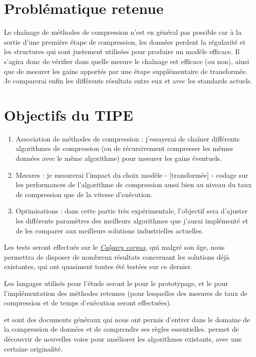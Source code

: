 \documentclass[a4paper, 11pt]{article}
\begin{document}
\section*{Problématique retenue}

Le chaînage de méthodes de compression n'est en général pas possible car à la sortie d'une première étape de compression, les données perdent la régularité et les structures qui sont justement utilisées pour produire un modèle efficace. Il s'agira donc de vérifier dans quelle mesure le chaînage est efficace (ou non), ainsi que de mesurer les gains apportés par une étape supplémentaire de transformée. Je comparerai enfin les différents résultats entre eux et avec les standards actuels.

\section*{Objectifs du TIPE}

\begin{enumerate}
  \item Association de méthodes de compression : j'essayerai de chaîner différents algorithmes de compression (ou de récursivement compresser les mêmes données avec le même algorithme) pour mesurer les gains éventuels.
  \item Mesures : je mesurerai l'impact du choix modèle - [transformée] - codage sur les performances de l'algorithme de compression aussi bien au niveau du taux de compression que de la vitesse d'exécution.
  \item Optimisations : dans cette partie très expérimentale, l'objectif sera d'ajuster les différents paramètres des meilleurs algorithmes que j'aurai implémenté et de les comparer aux meilleurs solutions industrielles actuelles.
\end{enumerate}

Les tests seront effectués sur le \href{https://en.wikipedia.org/wiki/Calgary_corpus}{\itshape{Calgary corpus}}, qui malgré son âge, nous permettra de disposer de nombreux résultats concernant les solutions déjà existantes, qui ont quasiment toutes été testées sur ce dernier.

Les langages utilisés pour l'étude seront le  pour le prototypage, et le  pour l'implémentation des méthodes retenues (pour lesquelles des mesures de taux de compression et de temps d'exécution seront effectuées).

\printbibliography

\cite{intro_proba} et \cite{coding_crypto} sont des documents généraux qui nous ont permis d'entrer dans le domaine de la compression de données et de comprendre ses règles essentielles. \cite{dev_comp_spertes} permet de découvrir de nouvelles voies pour améliorer les algorithmes existants, avec une certaine originalité.
\end{document}
